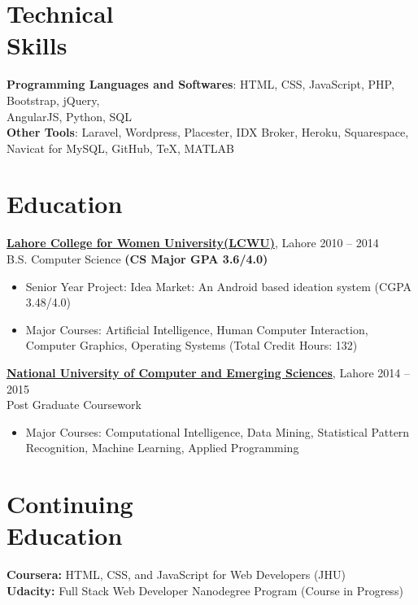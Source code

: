 \documentclass[margin,line]{res}
\begin{document}
\begin{resume}
\section{Technical \\Skills}
{\bf Programming Languages and Softwares}: HTML, CSS,  JavaScript, PHP, Bootstrap, jQuery, \\AngularJS, Python, SQL
\\{\bf Other Tools}: Laravel, Wordpress, Placester, IDX Broker, Heroku, Squarespace, Navicat for MySQL, GitHub, \TeX, MATLAB


\section{Education} 

\href{http://www.lcwu.edu.pk/}{\bf Lahore College for Women University(LCWU)}, Lahore \hfill 2010 -- 2014\\ B.S. Computer Science \hfill\textbf{(CS Major GPA 3.6/4.0)}
\begin{itemize} \itemsep -2pt  %
 \item Senior Year Project: Idea Market: An Android based ideation system \hfill(CGPA 3.48/4.0)
 \item  Major Courses: Artificial Intelligence, Human Computer Interaction,\\ Computer Graphics, Operating Systems (Total Credit Hours: 132)
 \end{itemize}

\href{http://www.nu.edu.pk/}{\bf National University of Computer and Emerging Sciences}, Lahore \hfill 2014 -- 2015\\ Post Graduate Coursework \hfill\
\begin{itemize} \itemsep -2pt  %
 \item Major Courses: Computational Intelligence, Data Mining, Statistical Pattern Recognition, Machine Learning, Applied Programming
 \end{itemize}


\section{Continuing \\Education}
{\bf Coursera:} HTML, CSS, and JavaScript for Web Developers (JHU)\\
{\bf Udacity:} Full Stack Web Developer Nanodegree Program (Course in Progress)


\end{resume}
\end{document}
